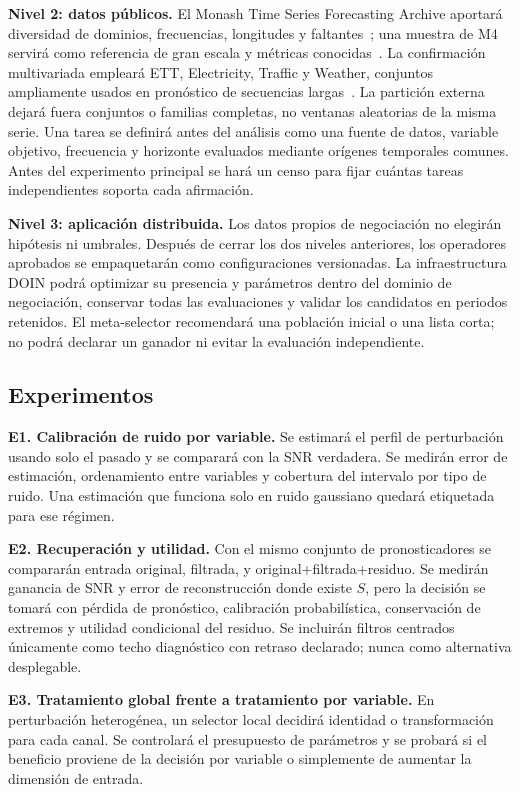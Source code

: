 \documentclass[11pt,letterpaper]{article}
\begin{document}
\textbf{Nivel 2: datos públicos.}
El Monash Time Series Forecasting Archive aportará diversidad de dominios, frecuencias, longitudes y faltantes~\cite{godahewa2021monash}; una muestra de M4 servirá como referencia de gran escala y métricas conocidas~\cite{makridakis2020m4}.
La confirmación multivariada empleará ETT, Electricity, Traffic y Weather, conjuntos ampliamente usados en pronóstico de secuencias largas~\cite{zhou2021informer}.
La partición externa dejará fuera conjuntos o familias completas, no ventanas aleatorias de la misma serie.
Una tarea se definirá antes del análisis como una fuente de datos, variable objetivo, frecuencia y horizonte evaluados mediante orígenes temporales comunes.
Antes del experimento principal se hará un censo para fijar cuántas tareas independientes soporta cada afirmación.

\textbf{Nivel 3: aplicación distribuida.}
Los datos propios de negociación no elegirán hipótesis ni umbrales.
Después de cerrar los dos niveles anteriores, los operadores aprobados se empaquetarán como configuraciones versionadas.
La infraestructura DOIN podrá optimizar su presencia y parámetros dentro del dominio de negociación, conservar todas las evaluaciones y validar los candidatos en periodos retenidos.
El meta-selector recomendará una población inicial o una lista corta; no podrá declarar un ganador ni evitar la evaluación independiente.

\subsection{Experimentos}

\textbf{E1. Calibración de ruido por variable.}
Se estimará el perfil de perturbación usando solo el pasado y se comparará con la SNR verdadera.
Se medirán error de estimación, ordenamiento entre variables y cobertura del intervalo por tipo de ruido.
Una estimación que funciona solo en ruido gaussiano quedará etiquetada para ese régimen.

\textbf{E2. Recuperación y utilidad.}
Con el mismo conjunto de pronosticadores se compararán entrada original, filtrada, y original+filtrada+residuo.
Se medirán ganancia de SNR y error de reconstrucción donde existe $S$, pero la decisión se tomará con pérdida de pronóstico, calibración probabilística, conservación de extremos y utilidad condicional del residuo.
Se incluirán filtros centrados únicamente como techo diagnóstico con retraso declarado; nunca como alternativa desplegable.

\textbf{E3. Tratamiento global frente a tratamiento por variable.}
En perturbación heterogénea, un selector local decidirá identidad o transformación para cada canal.
Se controlará el presupuesto de parámetros y se probará si el beneficio proviene de la decisión por variable o simplemente de aumentar la dimensión de entrada.
\end{document}
